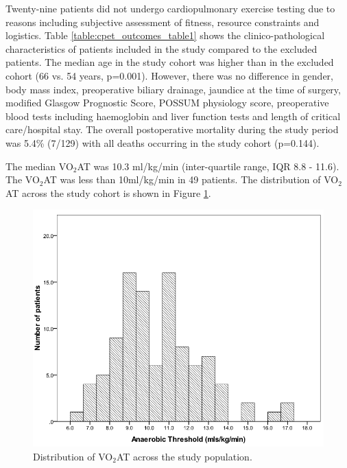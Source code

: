Twenty-nine patients did not undergo cardiopulmonary exercise testing due to reasons including subjective assessment of fitness, resource constraints and logistics. Table \ref{table:cpet_outcomes_table1} shows the clinico-pathological characteristics of patients included in the study compared to the excluded patients. The median age in the study cohort was higher than in the excluded cohort (66 vs. 54 years, p=0.001). However, there was no difference in gender, body mass index, preoperative biliary drainage, jaundice at the time of surgery, modified Glasgow Prognostic Score, POSSUM physiology score, preoperative blood tests including haemoglobin and liver function tests and length of critical care/hospital stay. The overall postoperative mortality during the study period was 5.4\% (7/129) with all deaths occurring in the study cohort (p=0.144).



The median VO$_2$AT was 10.3 ml/kg/min (inter-quartile range, IQR 8.8 - 11.6). The VO$_2$AT was less than 10ml/kg/min in 49 patients. The distribution of VO$_2$AT across the study cohort is shown in Figure \ref{fig:cpet_outcomes_dist_of_AT}.

\begin{figure}[htbp]
	\centering
	\includegraphics[width=0.8\linewidth]{Figures/cpet_outcomes_dist_of_AT}
	\caption{Distribution of VO$_2$AT across the study population.}
	\label{fig:cpet_outcomes_dist_of_AT}
\end{figure}

